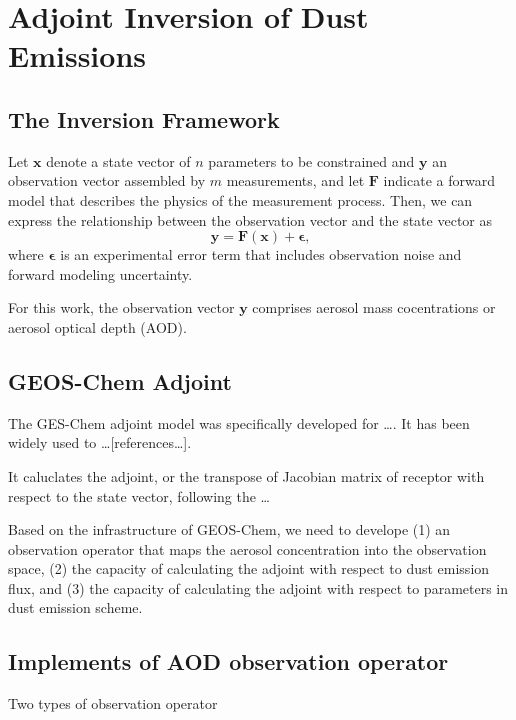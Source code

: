 \chapter{Adjoint Inversion of Dust Emissions}

\section{The Inversion Framework}

 Let $\mathbf{x}$ denote a state vector of $n$ parameters to be constrained 
 and $\mathbf{y}$ an observation vector assembled by $m$ measurements, 
 and let $\mathbf{F}$ indicate a forward model that describes the physics of
 the measurement process. Then, we can express the relationship between
 the observation vector and the state vector as
 \begin{equation}
 \mathbf{y} = \mathbf{F}(\mathbf{x}) + \boldsymbol{\epsilon} \mbox{,}
 \end{equation}
 where $\boldsymbol{\epsilon}$ is an experimental error term that includes
 observation noise and forward modeling uncertainty. 

 For this work, the observation vector $\mathbf{y}$ comprises aerosol mass 
 cocentrations or aerosol optical depth (AOD).  

\section{GEOS-Chem Adjoint}

 The GES-Chem adjoint model was specifically developed for \ldots \citep{henze07,henze09}.
 It has been widely used to \ldots [references\ldots]. 

 It caluclates the adjoint, or the transpose of Jacobian matrix of receptor with respect 
 to the state vector, following the \ldots

 Based on the infrastructure of GEOS-Chem, we need to develope (1) an observation operator 
 that maps the aerosol concentration into the observation space, (2) the capacity of 
 calculating the adjoint with respect to dust emission flux, and (3) the capacity of 
 calculating the adjoint with respect to parameters in dust emission scheme. 

\section{Implements of AOD observation operator}

Two types of observation operator

